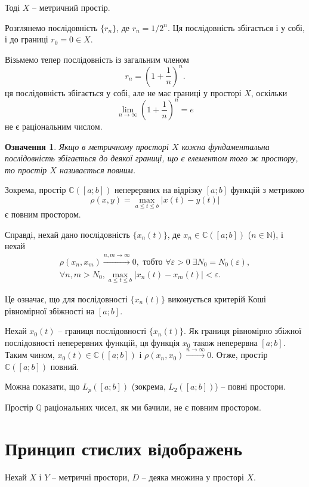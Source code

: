 \documentclass[14pt,twoside]{extreport}
\theoremstyle{mystyle}
\newtheorem{dfn}{Означення}
\numberwithin{equation}{chapter}
\newcommand{\cab}{\mathbb{C}([a; b])}
\begin{document}
Тоді $X$ -- метричний простір.

Розглянемо послідовність $\{r_n\}$, де $r_n = 1/2^n$. Ця послідовність збігається і у собі, і до границі $r_0 = 0 \in X$.

Візьмемо тепер послідовність із загальним членом
\[
 r_n=\left(1+\frac{1}{n}\right)^n.
\]
 ця послідовність збігається у собі, але не має границі у просторі $X$, оскільки
\[
 \lim_{n\to\infty}\left(1+\frac{1}{n}\right)^n=e
\]
не є раціональним числом.

\begin{dfn}
 Якщо в метричному просторі $X$ кожна фундаментальна послідовність збігається до деякої границі, що є елементом того ж простору, то простір $X$ називається повним.
\end{dfn}

Зокрема, простір $\cab$ неперервних на відрізку $[a; b]$ функцій з метрикою
\[
 \rho(x, y) = \max\limits_{a\leqslant t \leqslant b}|x(t) - y(t)|
\]
є повним простором.

Справді, нехай дано послідовність $\{x_n(t)\}$, де $x_n \in \cab$ ($n\in \mathbb{N}$), і нехай
\[
 \begin{array}{c}
  \rho(x_n, x_m) \xrightarrow{n,m \to \infty} 0, \textrm{ тобто }\forall \varepsilon>0 \; \exists N_0=N_0(\varepsilon),\\
  \forall n, m >N_0, \max\limits_{a \leqslant t \leqslant b} | x_n(t) - x_m(t)| <\varepsilon.
 \end{array}
\]

Це означає, що для послідовності $\{x_n(t)\}$ виконується критерій Коші рівномірної збіжності на $[a; b]$.

Нехай $x_0(t)$ -- границя послідовності $\{x_n(t)\}$. Як границя рівномірно збіжної послідовності неперервних функцій, ця функція $x_0$ також неперервна $[a; b]$. Таким чином, $x_0(t) \in \cab$ і $\rho(x_n, x_0) \xrightarrow{n\to\infty} 0$. Отже, простір $\cab$ повний.

Можна показати, що $L_p([a; b])$ (зокрема, $L_2([a; b])$) -- повні простори.

Простір $\mathbb{Q}$ раціональних чисел, як ми бачили, не є повним простором.

\section{Принцип стислих відображень}

Нехай $X$ і $Y$ -- метричні простори, $D$ -- деяка множина у просторі $X$.
\end{document}
